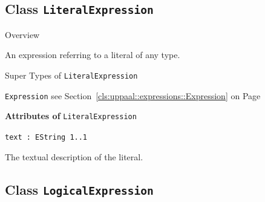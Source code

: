 	

\subsection{Class \bfseries \texttt{LiteralExpression}\normalfont}
\label{cls:uppaal::expressions::LiteralExpression} 
	
	\begin{longdescription}
		\item[Overview] 		
				

	

		An expression referring to a literal of any type.		
		\item[Super Types of \texttt{LiteralExpression}] ~
			\begin{longdescription}
				\item[\texttt{Expression}] see Section~\ref{cls:uppaal::expressions::Expression} on Page~\pageref{cls:uppaal::expressions::Expression}						\end{longdescription}
		
	
			\item[\textbf{Attributes of} \texttt{LiteralExpression}] ~
			\begin{longdescription}
	\item[\texttt{text : EString 	\symbol{"5B}1..1\symbol{"5D}
}] ~
	
	
	\nopagebreak
		
				

	

		The textual description of the literal.		
			\end{longdescription}
	
	\end{longdescription}
	

\subsection{Class \bfseries \texttt{LogicalExpression}\normalfont}
\label{cls:uppaal::expressions::LogicalExpression} 
	
